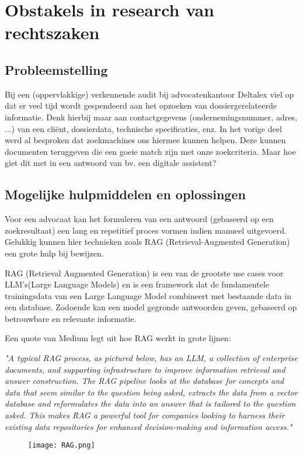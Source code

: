 \section{Obstakels in research van rechtszaken}
\subsection{Probleemstelling}
Bij een (oppervlakkige) verkennende audit bij advocatenkantoor Deltalex viel op dat er veel tijd wordt gespendeerd aan het opzoeken van dossiergerelateerde informatie.
Denk hierbij maar aan contactgegevens (ondernemingsnummer, adres, ...) van een cliënt, dossierdata, technische specificaties, enz.
In het vorige deel werd al besproken dat zoekmachines ons hiermee kunnen helpen. Deze kunnen documenten teruggeven die een goeie match zijn met onze zoekcriteria.
Maar hoe giet dit met in een antwoord van bv. een digitale assistent?

\subsection{Mogelijke hulpmiddelen en oplossingen}
Voor een advocaat kan het formuleren van een antwoord (gebaseerd op een zoekresultaat) een lang en repetitief proces vormen indien manueel uitgevoerd.
Gelukkig kunnen hier technieken zoals RAG (Retrieval-Augmented Generation) een grote hulp bij bewijzen.

RAG (Retrieval Augmented Generation) is een van de grootste use cases voor LLM's(Large Language Models) en is een framework dat de fundamentele trainingsdata van een Large Language Model
combineert met bestaande data in een database. Zodoende kan een model gegronde antwoorden geven, gebaseerd op betrouwbare en relevante informatie.

Een quote van Medium legt uit hoe RAG werkt in grote lijnen:

\begin{displayquote}
	\textit{"A typical RAG process, as pictured below, has an LLM, a collection of enterprise documents, and supporting infrastructure to improve information retrieval and answer construction.
		The RAG pipeline looks at the database for concepts and data that seem similar to the question being asked, extracts the data from a vector database and reformulates the data into
		an answer that is tailored to the question asked. This makes RAG a powerful tool for companies looking to harness their existing data repositories for enhanced decision-making
		and information access."} \autocite{MediumRAG}
	\begin{figure}[h]
		\texttt{[image: RAG.png]}
		\centering
	\end{figure}
\end{displayquote}
\newpage

